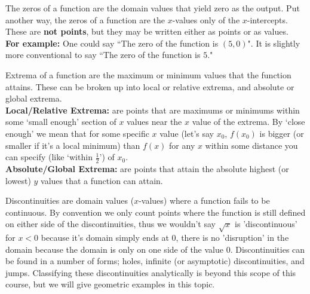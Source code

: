 \documentclass{ximera}
\begin{document}
\begin{definition}
    The zeros of a function are the domain values that yield zero as the output. Put another way, the zeros of a function are the $x$-values only of the $x$-intercepts. These are \textbf{not points}, but they may be written either as points or as values.\\
    \textbf{For example:} One could say ``The zero of the function is $(5,0)$". It is slightly more conventional to say ``The zero of the function is $5$."
\end{definition}

\begin{definition}[Extrema]
    Extrema of a function are the maximum or minimum values that the function attains. These can be broken up into local or relative extrema, and absolute or global extrema.\\
    \textbf{Local/Relative Extrema:} are points that are maximums or minimums within some `small enough' section of $x$ values near the $x$ value of the extrema. By `close enough' we mean that for some specific $x$ value (let's say $x_0$, $f(x_0)$ is bigger (or smaller if it's a local minimum) than $f(x)$ for any $x$ within some distance you can specify (like `within $\frac{1}{2}$')  of $x_0$.\\
    \textbf{Absolute/Global Extrema:} are points that attain the absolute highest (or lowest) $y$ values that a function can attain.
\end{definition}

\begin{definition}[Discontinuities]
    Discontinuities are domain values ($x$-values) where a function fails to be continuous. By convention we only count points where the function is still defined on either side of the discontinuities, thus we wouldn't say $\sqrt{x}$ is 'discontinuous' for $x < 0$ because it's domain simply ends at 0, there is no 'disruption' in the domain because the domain is only on one side of the value 0. Discontinuities can be found in a number of forms; holes, infinite (or asymptotic) discontinuities, and jumps. Classifying these discontinuities analytically is beyond this scope of this course, but we will give geometric examples in this topic.
\end{definition}
\end{document}
